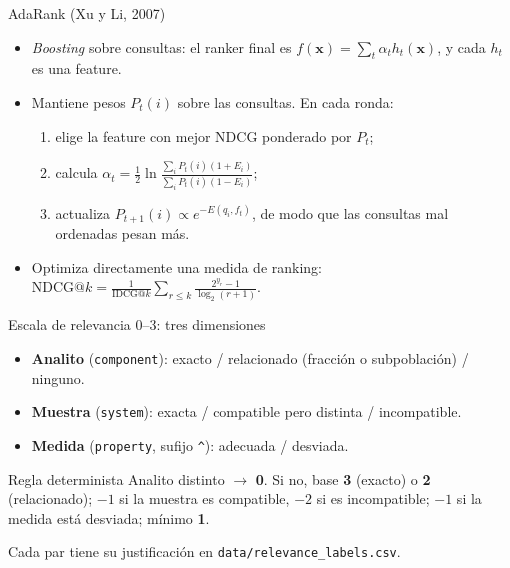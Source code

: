 \documentclass[aspectratio=169,11pt]{beamer}
\newcommand{\rel}[1]{\textbf{#1}}
\newcommand{\code}[1]{\texttt{#1}}
\begin{document}
\begin{frame}{AdaRank (Xu y Li, 2007)}
  \begin{itemize}
    \item \emph{Boosting} sobre consultas: el ranker final es $f(\mathbf{x})=\sum_t \alpha_t h_t(\mathbf{x})$, y cada $h_t$ es una feature.
    \item Mantiene pesos $P_t(i)$ sobre las consultas. En cada ronda:
      \begin{enumerate}
        \item elige la feature con mejor NDCG ponderado por $P_t$;
        \item calcula $\alpha_t=\frac12\ln\frac{\sum_i P_t(i)(1+E_i)}{\sum_i P_t(i)(1-E_i)}$;
        \item actualiza $P_{t+1}(i)\propto e^{-E(q_i,f_t)}$, de modo que las consultas mal ordenadas pesan más.
      \end{enumerate}
    \item Optimiza directamente una medida de ranking:
      $\mathrm{NDCG@}k=\frac{1}{\mathrm{IDCG@}k}\sum_{r\le k}\frac{2^{y_r}-1}{\log_2(r+1)}$.
  \end{itemize}
\end{frame}

\begin{frame}{Escala de relevancia 0--3: tres dimensiones}
  \begin{itemize}
    \item \textbf{Analito} (\code{component}): exacto / relacionado (fracción o subpoblación) / ninguno.
    \item \textbf{Muestra} (\code{system}): exacta / compatible pero distinta / incompatible.
    \item \textbf{Medida} (\code{property}, sufijo \code{\^{}}): adecuada / desviada.
  \end{itemize}
  \vspace{6pt}
  \begin{block}{Regla determinista}
    Analito distinto $\rightarrow$ \rel{0}. Si no, base \rel{3} (exacto) o \rel{2} (relacionado);
    $-1$ si la muestra es compatible, $-2$ si es incompatible; $-1$ si la medida está desviada; mínimo \rel{1}.
  \end{block}
  \small Cada par tiene su justificación en \code{data/relevance\_labels.csv}.
\end{frame}
\end{document}
